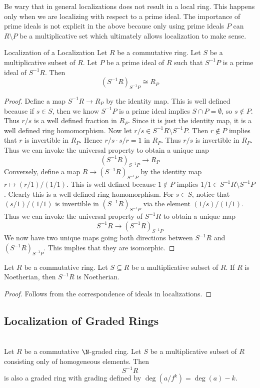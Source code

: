 \documentclass[a4paper]{article}
\begin{document}
Be wary that in general localizations does not result in a local ring. This happens only when we are localizing with respect to a prime ideal. The importance of prime ideals is not explicit in the above because only using prime ideals $P$ can $R\setminus P$ be a multiplicative set which ultimately allows localization to make sense. 

\begin{prp}{Localization of a Localization}{} Let $R$ be a commutative ring. Let $S$ be a multiplicative subset of $R$. Let $P$ be a prime ideal of $R$ such that $S^{-1}P$ is a prime ideal of $S^{-1}R$. Then $$(S^{-1}R)_{S^{-1}P}\cong R_P$$ 
\begin{proof}
Define a map $S^{-1}R\to R_P$ by the identity map. This is well defined because if $s\in S$, then we know $S^{-1}P$ is a prime ideal implies $S\cap P=\emptyset$, so $s\notin P$. Thus $r/s$ is a well defined fraction in $R_P$. Since it is just the identity map, it is a well defined ring homomorphism. Now let $r/s\in S^{-1}R\setminus S^{-1}P$. Then $r\notin P$ implies that $r$ is invertible in $R_P$. Hence $r/s\cdot s/r=1$ in $R_P$. Thus $r/s$ is invertible in $R_P$. Thus we can invoke the universal property to obtain a unique map $$(S^{-1}R)_{S^{-1}P}\to R_P$$ Conversely, define a map $R\to (S^{-1}R)_{S^{-1}P}$ by the identity map $r\mapsto (r/1)/(1/1)$. This is well defined because $1\notin P$ implies $1/1\in S^{-1}R\setminus S^{-1}P$. Clearly this is a well defined ring homomorphism. For $s\in S$, notice that $(s/1)/(1/1)$ is invertible in $(S^{-1}R)_{S^{-1}P}$ via the element $(1/s)/(1/1)$. Thus we can invoke the universal property of $S^{-1}R$ to obtain a unique map $$S^{-1}R\to(S^{-1}R)_{S^{-1}P}$$ We now have two unique maps going both directions between $S^{-1}R$ and $(S^{-1}R)_{S^{-1}P}$. This implies that they are isomorphic. 
\end{proof}
\end{prp}

\begin{lmm}{}{} Let $R$ be a commutative ring. Let $S\subseteq R$ be a multiplicative subset of $R$. If $R$ is Noetherian, then $S^{-1}R$ is Noetherian. 
\begin{proof}
Follows from the correspondence of ideals in localizations. 
\end{proof}
\end{lmm}

\subsection{Localization of Graded Rings}
\begin{prp}{}{}\\
Let $R$ be a commutative $\N$-graded ring. Let $S$ be a multiplicative subset of $R$ consisting only of homogeneous elements. Then $$S^{-1}R$$ is also a graded ring with grading defined by $\deg(a/f^k)=\deg(a)-k$. 
\end{prp}
\end{document}

